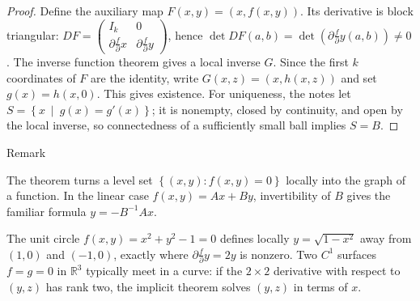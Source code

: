 \begin{proof}

Define the auxiliary map \(F\left( {x,y} \right) = \left( {x,f\left( {x,y} \right)} \right)\). Its derivative is block triangular: \(DF = \begin{pmatrix}
I_{k} & 0 \\
{\partial\frac{f}{\partial}x} & {\partial\frac{f}{\partial}y}
\end{pmatrix}\), hence \(\det DF\left( {a,b} \right) = \det\left( {\partial\frac{f}{\partial}y\left( {a,b} \right)} \right) \neq 0\). The inverse function theorem gives a local inverse \(G\). Since the first \(k\) coordinates of \(F\) are the identity, write \(G\left( {x,z} \right) = \left( {x,h\left( {x,z} \right)} \right)\) and set \(g(x) = h\left( {x,0} \right)\). This gives existence. For uniqueness, the notes let \(S = \left\{ x\  \middle| \ g(x) = g'(x) \right\}\); it is nonempty, closed by continuity, and open by the local inverse, so connectedness of a sufficiently small ball implies \(S = B\).

\end{proof}

\begin{qlremark}{Remark}

The theorem turns a level set \(\left\{ {\left( {x,y} \right):f\left( {x,y} \right) = 0} \right\}\) locally into the graph of a function. In the linear case \(f\left( {x,y} \right) = Ax + By\), invertibility of \(B\) gives the familiar formula \(y = - B^{- 1}Ax\).

\end{qlremark}

\begin{example}

The unit circle \(f\left( {x,y} \right) = x^{2} + y^{2} - 1 = 0\) defines locally \(y = \sqrt{1 - x^{2}}\) away from \(\left( {1,0} \right)\) and \(\left( {- 1,0} \right)\), exactly where \(\partial\frac{f}{\partial}y = 2y\) is nonzero. Two \(C^{1}\) surfaces \(f = g = 0\) in \(\mathbb{R}^{3}\) typically meet in a curve: if the \(2 \times 2\) derivative with respect to \(\left( {y,z} \right)\) has rank two, the implicit theorem solves \(\left( {y,z} \right)\) in terms of \(x\).

\end{example}
